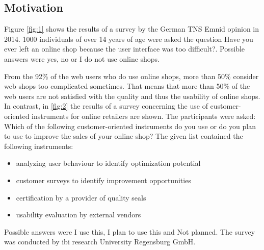 \documentclass[output=paper]{langsci/langscibook}
\begin{document}
\subsection{Motivation}

Figure \ref{fig:1} shows the results of a survey by the German TNS Emnid opinion in 2014. 1000 individuals of over 14 years of age were asked the question {\textquotedbl}Have you ever left an online shop because the user interface was too difficult?{\textquotedbl}. Possible answers were {\textquotedbl}yes{\textquotedbl}, {\textquotedbl}no{\textquotedbl} or {\textquotedbl}I do not use online shops{\textquotedbl}.


From the 92\% of the web users who do use online shops, more than 50\% consider web shops too complicated sometimes. That means that more than 50\% of the web users are not satisfied with the quality and thus the usability of online shops. In contrast, in \ref{fig:2} the results of a survey concerning the use of customer-oriented instruments for online retailers are shown. The participants were asked: {\textquotedbl}Which of the following customer-oriented instruments do you use or do you plan to use to improve the sales of your online shop?{\textquotedbl} The given list contained the following instruments:


\begin{itemize}
\item analyzing user behaviour to identify optimization potential 
\item customer surveys to identify improvement opportunities 
\item certification by a provider of quality seals 
\item usability evaluation by external vendors 
\end{itemize}

Possible answers were {\textquotedbl}I use this{\textquotedbl}, {\textquotedbl}I plan to use this{\textquotedbl} and {\textquotedbl}Not planned{\textquotedbl}. The survey was conducted by ibi research University Regensburg GmbH. 
\end{document}
